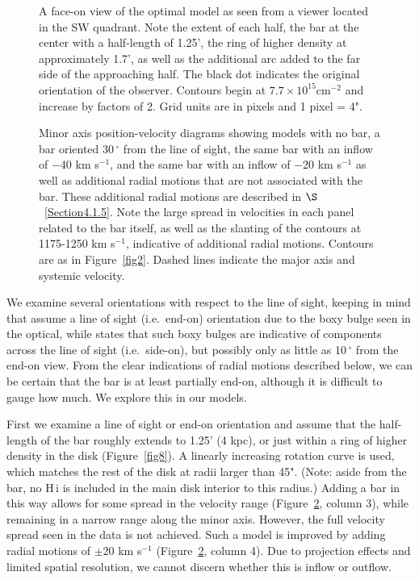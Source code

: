 \documentclass{emulateapj}
\begin{document}
\begin{figure}
\caption{A face-on view of the optimal model as seen from a viewer located in the SW quadrant.   Note the extent of each half, the bar at the center with a half-length of 1.25', the ring of higher density at approximately 1.7', as well as the additional arc added to the far side of the approaching half.  The black dot indicates the original orientation of the observer.  Contours begin at $7.7\times10^{15}\mathrm{cm^{-2}}$ and increase by factors of 2.  Grid units are in pixels and 1 pixel = 4". \label{fig9}}
\end{figure}

\begin{figure}
\caption{Minor axis position-velocity diagrams showing models with no bar, a bar oriented 30$\,^{\circ}$ from the line of sight, the same bar with an inflow of $-$40 km s$^{-1}$, and the same bar with an inflow of $-$20 km s$^{-1}$ as well as additional radial motions that are not associated with the bar.  These additional radial motions are described in $\S$~\ref{Section4.1.5}.   Note the large spread in velocities in each panel related to the bar itself, as well as the slanting of the contours at 1175-1250 km s$^{-1}$, indicative of additional radial motions.  Contours are as in Figure~\ref{fig2}. Dashed lines indicate the major axis and systemic velocity.\label{fig10}}
\end{figure}

\par
     We examine several orientations with respect to the line of sight, keeping in mind that \citet{2010ApJ...715L.176K} assume a line of sight (i.e.\ end-on) orientation due to the boxy bulge seen in the optical, while \citet{2005MNRAS.358.1477A} states that such boxy bulges are indicative of components across the line of sight (i.e.\ side-on), but possibly only as little as 10$\,^{\circ}$ from the end-on view. From the clear indications of radial motions described below, we can be certain that the bar is at least partially end-on, although it is difficult to gauge how much. We explore this in our models.

\par
   First we examine a line of sight or end-on orientation and assume that the half-length of the bar roughly extends to 1.25' (4 kpc), or just within a ring of higher density in the disk (Figure~\ref{fig8}).  A linearly increasing rotation curve is used, which matches the rest of the disk at radii larger than 45".  (Note:  aside from the bar, no {\sc H\,i} is included in the main disk interior to this radius.)  Adding a bar in this way allows for some spread in the velocity range (Figure~\ref{fig10}, column 3), while remaining in a narrow range along the minor axis.  However, the full velocity spread seen in the data is not achieved. Such a model is improved by adding radial motions of $\pm$20 km s$^{-1}$ (Figure~\ref{fig10}, column 4). Due to projection effects and limited spatial resolution, we cannot discern whether this is inflow or outflow.
\end{document}
